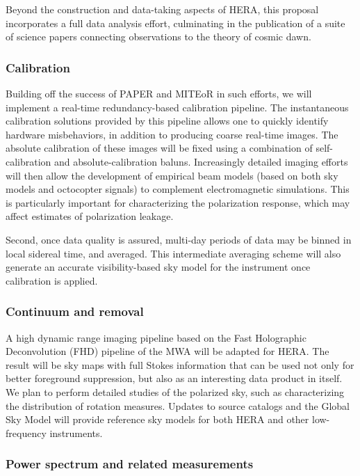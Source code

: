 \documentclass[preprint]{aastex}
\begin{document}
Beyond the construction and data-taking aspects of HERA, this proposal incorporates a full data analysis effort, culminating in the publication of a suite of science papers connecting observations to the theory of cosmic dawn.

\subsubsection{Calibration}

Building off the success of PAPER and MITEoR in such efforts, we will implement a real-time redundancy-based calibration pipeline.  The instantaneous calibration solutions provided by this pipeline allows one to quickly identify hardware misbehaviors, in addition to producing coarse real-time images.  The absolute calibration of these images will be fixed using a combination of self-calibration and absolute-calibration baluns.  Increasingly detailed imaging efforts will then allow the development of empirical beam models (based on both sky models and octocopter signals) to complement electromagnetic simulations.  This is particularly important for characterizing the polarization response, which may affect estimates of polarization leakage.

Second, once data quality is assured, multi-day periods of data may be
binned in local sidereal time, and averaged. This intermediate
averaging scheme will also generate an accurate visibility-based sky
model for the instrument once calibration is applied.

\subsubsection{Continuum and removal}

A high dynamic range imaging pipeline based on the Fast Holographic Deconvolution (FHD) pipeline of the MWA will be adapted for HERA.  The result will be sky maps with full Stokes information that can be used not only for better foreground suppression, but also as an interesting data product in itself.  We plan to perform detailed studies of the polarized sky, such as characterizing the distribution of rotation measures.  Updates to source catalogs and the Global Sky Model \cite{deoliveira2008} will provide reference sky models for both HERA and other low-frequency instruments.

\subsubsection{Power spectrum and related measurements}
\end{document}
